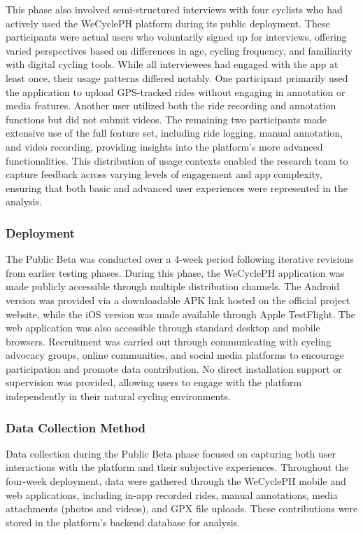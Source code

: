 This phase also involved semi-structured interviews with four cyclists who had actively used the WeCyclePH platform during its public deployment. These participants were actual users who voluntarily signed up for interviews, offering varied perspectives based on differences in age, cycling frequency, and familiarity with digital cycling tools. While all interviewees had engaged with the app at least once, their usage patterns differed notably. One participant primarily used the application to upload GPS-tracked rides without engaging in annotation or media features. Another user utilized both the ride recording and annotation functions but did not submit videos. The remaining two participants made extensive use of the full feature set, including ride logging, manual annotation, and video recording, providing insights into the platform’s more advanced functionalities. This distribution of usage contexts enabled the research team to capture feedback across varying levels of engagement and app complexity, ensuring that both basic and advanced user experiences were represented in the analysis.

\subsubsection{Deployment}
The Public Beta was conducted over a 4-week period following iterative revisions from earlier testing phases. During this phase, the WeCyclePH application was made publicly accessible through multiple distribution channels. The Android version was provided via a downloadable APK link hosted on the official project website, while the iOS version was made available through Apple TestFlight. The web application was also accessible through standard desktop and mobile browsers. Recruitment was carried out through communicating with cycling advocacy groups, online communities, and social media platforms to encourage participation and promote data contribution. No direct installation support or supervision was provided, allowing users to engage with the platform independently in their natural cycling environments.

\subsubsection{Data Collection Method}
Data collection during the Public Beta phase focused on capturing both user interactions with the platform and their subjective experiences. Throughout the four-week deployment, data were gathered through the WeCyclePH mobile and web applications, including in-app recorded rides, manual annotations, media attachments (photos and videos), and GPX file uploads. These contributions were stored in the platform's backend database for analysis.

